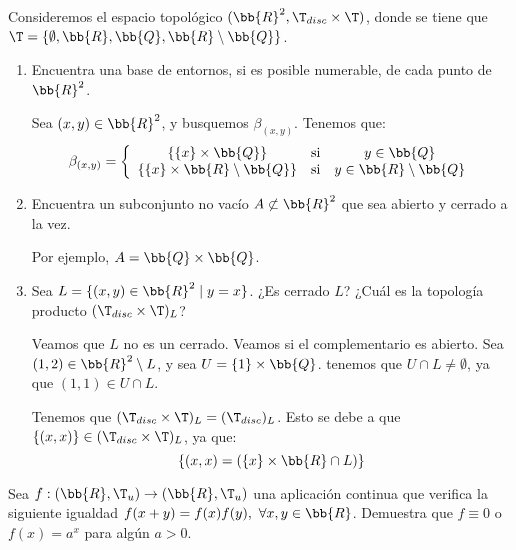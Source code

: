 \begin{ejercicio}
    Consideremos el espacio topológico $(\bb{R}^2, \T_{disc} \times \T )$, donde se tiene que $\T = \{\emptyset, \bb{R}, \bb{Q}, \bb{R}\setminus \bb{Q}\}$.
    \begin{enumerate}
        \item Encuentra una base de entornos, si es posible numerable, de cada punto de $\bb{R}^2$.

        Sea $(x,y)\in \bb{R}^2$, y busquemos $\beta_{(x,y)}$. Tenemos que:
        \begin{equation*}
            \beta_{(x,y)} = 
            \left\{
            \begin{array}{ccc}
                \{\{x\}\times \bb{Q}\} & \text{si} & y\in \bb{Q} \\
                \{\{x\}\times \bb{R}\setminus\bb{Q}\} & \text{si} & y\in \bb{R}\setminus\bb{Q} 
            \end{array}
            \right.
        \end{equation*}
        
        \item Encuentra un subconjunto no vacío $A \not \subset \bb{R}^2$ que sea abierto y cerrado a la vez.

        Por ejemplo, $A=\bb{Q}\times \bb{Q}$.
        
        \item Sea $L = \{(x, y) \in \bb{R}^2\mid y = x\}$. ¿Es cerrado $L$? ¿Cuál es la topología producto $(\T_{disc} \times \T )_L$?

        Veamos que $L$ no es un cerrado. Veamos si el complementario es abierto. Sea $(1,2)\in \bb{R}^2\setminus L$, y sea $U=\{1\}\times \bb{Q}$.  tenemos que $U\cap L\neq \emptyset$, ya que $(1,1)\in U\cap L$.

        Tenemos que $(\T_{disc}\times \T)_L = (\T_{disc})_L$. Esto se debe a que $\{(x,x)\}\in (\T_{disc}\times \T)_L$, ya que:
        \begin{equation*}
            \{(x,x)=(\{x\}\times \bb{R}\cap L)\}
        \end{equation*}
    \end{enumerate}
\end{ejercicio}


\begin{ejercicio}
    Sea $f : (\bb{R}, \T_u) \to (\bb{R}, \T_u)$ una aplicación continua que verifica la siguiente igualdad $f(x + y) = f(x)f(y),~\forall x, y \in \bb{R}$. Demuestra que $f\equiv 0$ o $f(x) = a^x$ para algún $a > 0$.
\end{ejercicio}

